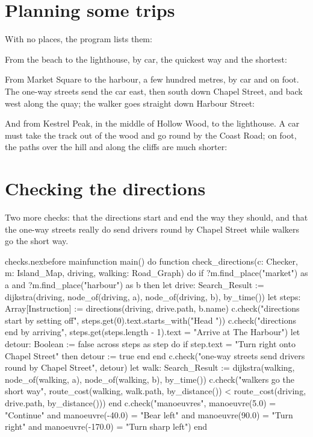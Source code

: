 \section{Planning some trips}

With no places, the program lists them:


From the beach to the lighthouse, by car, the quickest way and the
shortest:


From Market Square to the harbour, a few hundred metres, by car and on
foot. The one-way streets send the car east, then south down Chapel
Street, and back west along the quay; the walker goes straight down
Harbour Street:


And from Kestrel Peak, in the middle of Hollow Wood, to the lighthouse. A
car must take the track out of the wood and go round by the Coast Road;
on foot, the paths over the hill and along the cliffs are much shorter:


\section{Checking the directions}

Two more checks: that the directions start and end the way they should, and
that the one-way streets really do send drivers round by Chapel Street
while walkers go the short way.

\begin{addbefore}{checks.nex}{before main}{function main() do}
function check_directions(c: Checker, m: Island_Map, driving, walking: Road_Graph) do
  if ?m.find_place("market") as a and ?m.find_place("harbour") as b then
    let drive: Search_Result := dijkstra(driving, node_of(driving, a), node_of(driving, b), by_time())
    let steps: Array[Instruction] := directions(driving, drive.path, b.name)
    c.check("directions start by setting off", steps.get(0).text.starts_with("Head "))
    c.check("directions end by arriving", steps.get(steps.length - 1).text = "Arrive at The Harbour")
    let detour: Boolean := false
    across steps as step do
      if step.text = "Turn right onto Chapel Street" then
        detour := true
      end
    end
    c.check("one-way streets send drivers round by Chapel Street", detour)
    let walk: Search_Result := dijkstra(walking, node_of(walking, a), node_of(walking, b), by_time())
    c.check("walkers go the short way", route_cost(walking, walk.path, by_distance())
      < route_cost(driving, drive.path, by_distance()))
  end
  c.check("manoeuvres", manoeuvre(5.0) = "Continue" and manoeuvre(-40.0) = "Bear left"
    and manoeuvre(90.0) = "Turn right" and manoeuvre(-170.0) = "Turn sharp left")
end
\end{addbefore}

